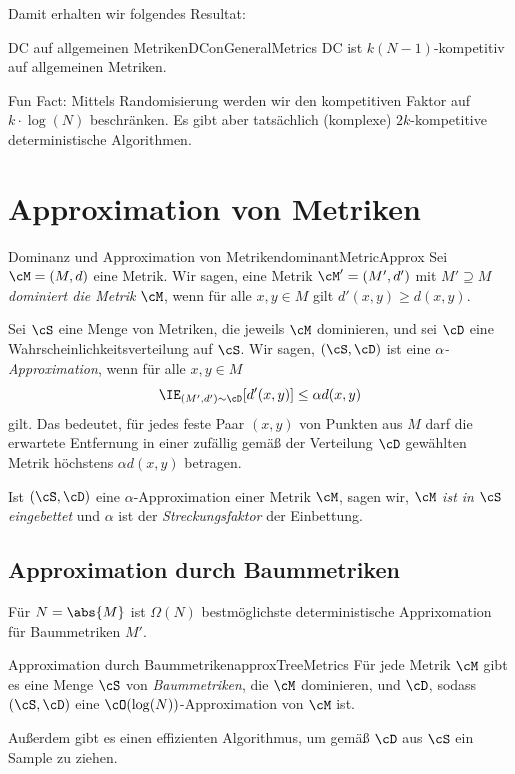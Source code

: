 \documentclass[language=ngerman,algolist]{TemplateLecture}
\begin{document}
Damit erhalten wir folgendes Resultat:
\begin{thm}{DC auf allgemeinen Metriken}{DConGeneralMetrics}
    DC ist $k(N-1)$-kompetitiv auf allgemeinen Metriken.
\end{thm}

Fun Fact: Mittels Randomisierung werden wir den kompetitiven Faktor auf $k \cdot \log(N)$ beschränken. Es gibt aber tatsächlich (komplexe) $2k$-kompetitive deterministische Algorithmen.


\chapter{Approximation von Metriken}

\begin{defi}{Dominanz und Approximation von Metriken}{dominantMetricApprox}
    Sei $\cM = (M, d)$ eine Metrik. Wir sagen, eine Metrik $\cM' = (M', d')$ mit $M' \supseteq M$ \emph{dominiert die Metrik $\cM$}, wenn für alle $x, y \in M$ gilt $d'(x,y) \geq d(x, y)$.

    Sei $\cS$ eine Menge von Metriken, die jeweils $\cM$ dominieren, und sei $\cD$ eine Wahrscheinlichkeitsverteilung auf $\cS$. Wir sagen, $(\cS, \cD)$ ist eine \emph{$\alpha$-Approximation}, wenn für alle $x, y \in M$
    \begin{equation*}
        \IE_{(M', d') \sim \cD}[d'(x,y)] \leq \alpha d(x,y)
    \end{equation*}
    gilt. Das bedeutet, für jedes feste Paar $(x,y)$ von Punkten aus $M$ darf die erwartete Entfernung in einer zufällig gemäß der Verteilung $\cD$ gewählten Metrik höchstens $\alpha d(x,y)$ betragen.

    Ist $(\cS, \cD)$ eine $\alpha$-Approximation einer Metrik $\cM$, sagen wir, \emph{$\cM$ ist in $\cS$ eingebettet} und $\alpha$ ist der \emph{Streckungsfaktor} der Einbettung.
\end{defi}

\section{Approximation durch Baummetriken}

Für $N = \abs{M}$ ist $\Omega(N)$ bestmöglichste deterministische Apprixomation für Baummetriken $M'$.

\begin{thm}{Approximation durch Baummetriken}{approxTreeMetrics}
    Für jede Metrik $\cM$ gibt es eine Menge $\cS$ von \emph{Baummetriken}, die $\cM$ dominieren, und $\cD$, sodass $(\cS, \cD)$ eine $\cO(\log(N))$-Approximation von $\cM$ ist. 

    Außerdem gibt es einen effizienten Algorithmus, um gemäß $\cD$ aus $\cS$ ein Sample zu ziehen.
\end{thm}
\end{document}
